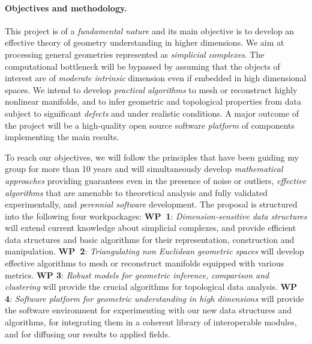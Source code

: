 \paragraph{Objectives and methodology.}
This project is of a {\em fundamental nature} and its main objective is to develop an effective theory of geometry understanding in higher dimensions. We aim at processing general geometries represented as {\em simplicial complexes}. The computational bottleneck will be bypassed by assuming that the objects of interest are of {\em moderate intrinsic} dimension even if embedded in high dimensional spaces. We intend to develop {\em practical algorithms} to mesh or reconstruct highly nonlinear manifolds, and to infer geometric and topological properties from data subject to significant {\em defects} and
 under realistic conditions. A major outcome of the project will be a high-quality open source software {\em platform} of components implementing the main results.

To reach our objectives, we will follow the principles that have been guiding my group for more than 10 years and will simultaneously develop
{\em mathematical approaches} providing guarantees even in the presence of noise or outliers,
{\em effective algorithms} that are amenable to theoretical analysis and fully validated experimentally,
and {\em perennial software} development.
The proposal is structured into the following four workpackages:
{\bf WP~1}:  {\em Dimension-sensitive data  structures} will extend current knowledge about simplicial complexes, and  provide efficient data structures and basic algorithms for their representation, construction and manipulation. 
  {\bf WP~2}:  {\em Triangulating non Euclidean geometric spaces} will develop effective algorithms to mesh or reconstruct manifolds equipped with various metrics.   {\bf WP 3}: {\em Robust models for geometric inference, comparison and  clustering} will provide the crucial  algorithms for topological data analysis.
 {\bf WP 4}:  {\em  Software platform for geometric understanding in high dimensions} will provide the software environment for experimenting with our new data structures and algorithms, for integrating them in a coherent library of interoperable modules, and for diffusing our results to applied fields. 

